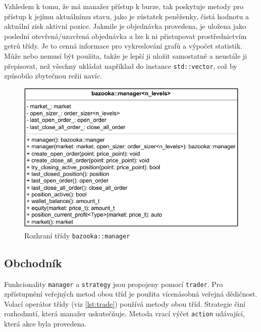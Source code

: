 Vzhledem k tomu, že má manažer přístup k burze, tak poskytuje metody pro přístup k jejímu aktuálnímu stavu, jako je zůstatek peněženky, čistá hodnotu a aktuální zisk aktivní pozice.
Jakmile je objednávka provedena, je uložena jako poslední otevřená/uzavřená objednávka a lze k ni přistupovat prostřednictvím getrů třídy.
Je to cenná informace pro vykreslování grafů a výpočet statistik.
Může nebo nemusí být použita, takže je lepší ji uložit samostatně a neustále ji přepisovat, než všechny ukládat například do instance \texttt{std::vector}, což by způsobilo zbytečnou režii navíc.

\begin{figure}[htbp]
\centerline{\includegraphics[scale=0.85]{img/bazooka-manager-uml.pdf}}
\caption{Rozhraní třídy \texttt{bazooka::manager}}
\label{fig:bazooka:manager:uml}
\end{figure}

\subsection{Obchodník}
Funkcionality \texttt{manager} a \texttt{strategy} jsou propojeny pomocí \texttt{trader}.
Pro zpřístupnění veřejných metod obou tříd je použita vícenásobná veřejná dědičnost.
Volací operátor třídy (viz \ref{lst:trade}) používá metody obou tříd.
Strategie činí rozhodnutí, která manažer uskutečňuje.
Metoda vrací výčet \texttt{action} udávající, která akce byla provedena.


